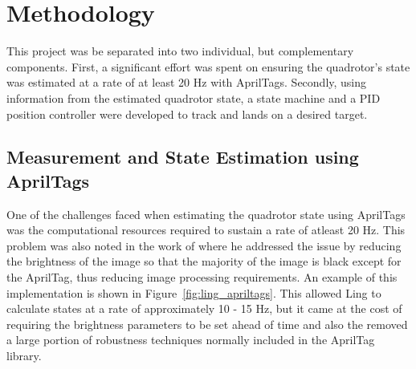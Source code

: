 \documentclass[11pt, twocolumn]{article}
\begin{document}
\section{Methodology}
This project was be separated into two individual, but complementary components. First, a significant effort was spent on ensuring the quadrotor's state was estimated at a rate of at least 20 Hz with AprilTags. Secondly, using information from the estimated quadrotor state, a state machine and a PID position controller were developed to track and lands on a desired target.

\subsection{Measurement and State Estimation using AprilTags}
\label{subsec:AprilTag}
One of the challenges faced when estimating the quadrotor state using AprilTags was the computational resources required to sustain a rate of atleast 20 Hz. This problem was also noted in the work of \cite{Ling2014} where he addressed the issue by reducing the brightness of the image so that the majority of the image is black except for the AprilTag, thus reducing image processing requirements. An example of this implementation is shown in Figure~\ref{fig:ling_apriltags}. This allowed Ling \cite{Lee2012} to calculate states at a rate of approximately 10 - 15 Hz, but it came at the cost of requiring the brightness parameters to be set ahead of time and also the removed a large portion of robustness techniques normally included in the AprilTag library.
\end{document}
